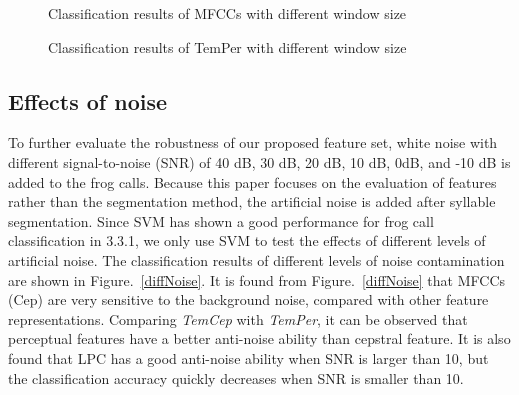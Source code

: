 \begin{figure}[htb!] %
\caption{Classification results of MFCCs with different window size}
\label{diffWinSize1} 
\end{figure}

\begin{figure}[htb!] %
\caption{Classification results of TemPer with different window size}
\label{diffWinSize2} 
\end{figure}

\subsection{Effects of noise}
To further evaluate the robustness of our proposed feature set, white noise with different signal-to-noise (SNR) of 40 dB, 30 dB, 20 dB, 10 dB, 0dB, and -10 dB is added to the frog calls. Because this paper focuses on the evaluation of features rather than the segmentation method, the artificial noise is added after syllable segmentation. Since SVM has shown a good performance for frog call classification in 3.3.1, we only use SVM to test the effects of different levels of artificial noise. The classification results of different levels of noise contamination are shown in Figure.~\ref{diffNoise}. It is found from Figure.~\ref{diffNoise} that MFCCs (Cep) are very sensitive to the background noise, compared with other feature representations. Comparing \textit{TemCep} with \textit{TemPer}, it can be observed that perceptual features have a better anti-noise ability than cepstral feature. It is also found that LPC has a good anti-noise ability when SNR is larger than 10, but the classification accuracy quickly decreases when SNR is smaller than 10. 



